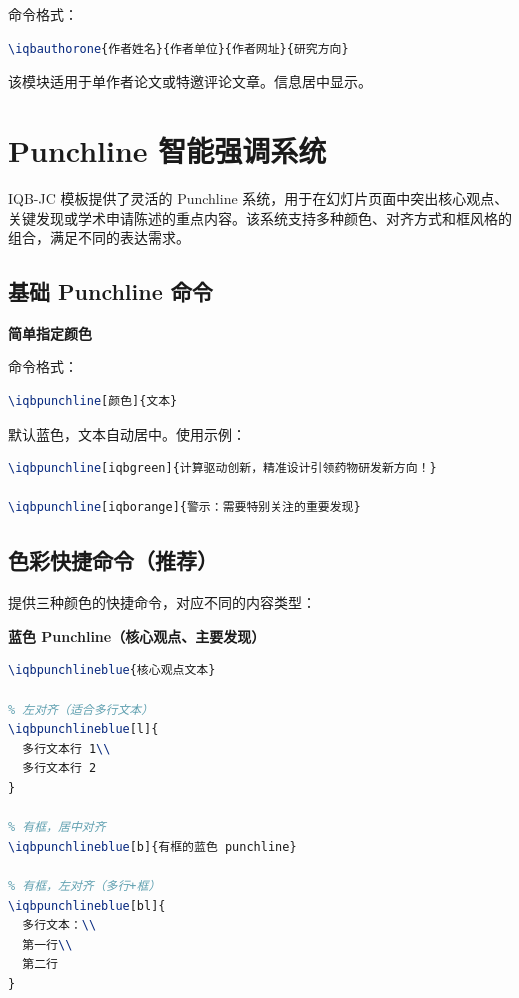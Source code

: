 命令格式：

\begin{lstlisting}[style=blockstyle,language=TeX]
\iqbauthorone{作者姓名}{作者单位}{作者网址}{研究方向}
\end{lstlisting}

该模块适用于单作者论文或特邀评论文章。信息居中显示。

\section{Punchline 智能强调系统}

\label{sec:punchline}

IQB-JC 模板提供了灵活的 Punchline 系统，用于在幻灯片页面中突出核心观点、关键发现或学术申请陈述的重点内容。该系统支持多种颜色、对齐方式和框风格的组合，满足不同的表达需求。

\subsection{基础 Punchline 命令}

\textbf{简单指定颜色}

命令格式：

\begin{lstlisting}[style=blockstyle,language=TeX]
\iqbpunchline[颜色]{文本}
\end{lstlisting}

默认蓝色，文本自动居中。使用示例：

\begin{lstlisting}[style=blockstyle,language=TeX]
\iqbpunchline[iqbgreen]{计算驱动创新，精准设计引领药物研发新方向！}

\iqbpunchline[iqborange]{警示：需要特别关注的重要发现}
\end{lstlisting}

\subsection{色彩快捷命令（推荐）}

提供三种颜色的快捷命令，对应不同的内容类型：

\textbf{蓝色 Punchline（核心观点、主要发现）}

\begin{lstlisting}[style=blockstyle,language=TeX]
% 最简单：默认无框，居中对齐
\iqbpunchlineblue{核心观点文本}

% 左对齐（适合多行文本）
\iqbpunchlineblue[l]{
  多行文本行 1\\
  多行文本行 2
}

% 有框，居中对齐
\iqbpunchlineblue[b]{有框的蓝色 punchline}

% 有框，左对齐（多行+框）
\iqbpunchlineblue[bl]{
  多行文本：\\
  第一行\\
  第二行
}
\end{lstlisting}

